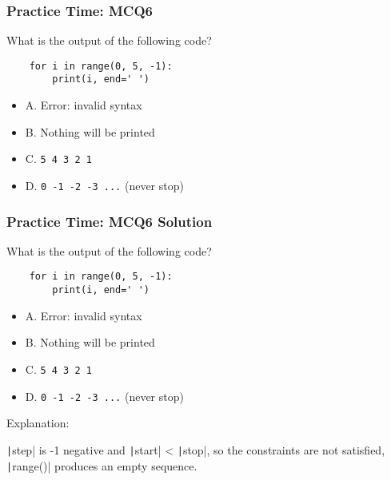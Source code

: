 \documentclass{beamer}
\begin{document}
\begin{frame}[fragile]
    \frametitle{Practice Time: MCQ6}
    What is the output of the following code?
    \begin{verbatim}
    for i in range(0, 5, -1):
        print(i, end=' ')
    \end{verbatim}
    \begin{itemize}
        \item A. Error: invalid syntax
        \item B. Nothing will be printed
        \item C. \texttt{5 4 3 2 1}
        \item D. \texttt{0 -1 -2 -3 ...} (never stop)
    \end{itemize}
\end{frame}
\begin{frame}[fragile]
    \frametitle{Practice Time: MCQ6 Solution}
    What is the output of the following code?
    \begin{verbatim}
    for i in range(0, 5, -1):
        print(i, end=' ')
    \end{verbatim}
    \begin{itemize}
        \item A. Error: invalid syntax
        \item \alert{B. Nothing will be printed}
        \item C. \texttt{5 4 3 2 1}
        \item D. \texttt{0 -1 -2 -3 ...} (never stop)
    \end{itemize}

    Explanation:

    \texttt|step| is -1 negative and
    \texttt|start| < \texttt|stop|,
    so the constraints are not satisfied,
    \texttt|range()| produces an empty sequence.
\end{frame}
\end{document}
